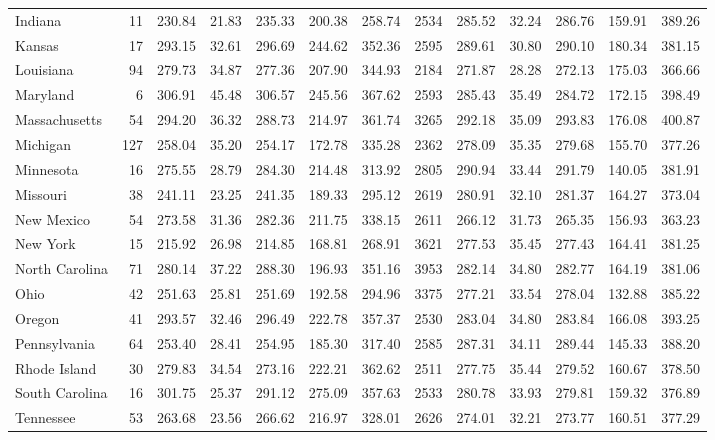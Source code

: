\begin{sidewaystable}[htb]
\begin{center}
{\begin{tabular}{lrrrrrr@{\extracolsep{10pt}}rrrrrr}
  Indiana &  11 & 230.84 & 21.83 & 235.33 & 200.38 & 258.74 & 2534 & 285.52 & 32.24 & 286.76 & 159.91 & 389.26 \\ 
  Kansas &  17 & 293.15 & 32.61 & 296.69 & 244.62 & 352.36 & 2595 & 289.61 & 30.80 & 290.10 & 180.34 & 381.15 \\ 
  Louisiana &  94 & 279.73 & 34.87 & 277.36 & 207.90 & 344.93 & 2184 & 271.87 & 28.28 & 272.13 & 175.03 & 366.66 \\ 
  Maryland &   6 & 306.91 & 45.48 & 306.57 & 245.56 & 367.62 & 2593 & 285.43 & 35.49 & 284.72 & 172.15 & 398.49 \\ 
  Massachusetts &  54 & 294.20 & 36.32 & 288.73 & 214.97 & 361.74 & 3265 & 292.18 & 35.09 & 293.83 & 176.08 & 400.87 \\ 
  Michigan & 127 & 258.04 & 35.20 & 254.17 & 172.78 & 335.28 & 2362 & 278.09 & 35.35 & 279.68 & 155.70 & 377.26 \\ 
  Minnesota &  16 & 275.55 & 28.79 & 284.30 & 214.48 & 313.92 & 2805 & 290.94 & 33.44 & 291.79 & 140.05 & 381.91 \\ 
  Missouri &  38 & 241.11 & 23.25 & 241.35 & 189.33 & 295.12 & 2619 & 280.91 & 32.10 & 281.37 & 164.27 & 373.04 \\ 
  New Mexico &  54 & 273.58 & 31.36 & 282.36 & 211.75 & 338.15 & 2611 & 266.12 & 31.73 & 265.35 & 156.93 & 363.23 \\ 
  New York &  15 & 215.92 & 26.98 & 214.85 & 168.81 & 268.91 & 3621 & 277.53 & 35.45 & 277.43 & 164.41 & 381.25 \\ 
  North Carolina &  71 & 280.14 & 37.22 & 288.30 & 196.93 & 351.16 & 3953 & 282.14 & 34.80 & 282.77 & 164.19 & 381.06 \\ 
  Ohio &  42 & 251.63 & 25.81 & 251.69 & 192.58 & 294.96 & 3375 & 277.21 & 33.54 & 278.04 & 132.88 & 385.22 \\ 
  Oregon &  41 & 293.57 & 32.46 & 296.49 & 222.78 & 357.37 & 2530 & 283.04 & 34.80 & 283.84 & 166.08 & 393.25 \\ 
  Pennsylvania &  64 & 253.40 & 28.41 & 254.95 & 185.30 & 317.40 & 2585 & 287.31 & 34.11 & 289.44 & 145.33 & 388.20 \\ 
  Rhode Island &  30 & 279.83 & 34.54 & 273.16 & 222.21 & 362.62 & 2511 & 277.75 & 35.44 & 279.52 & 160.67 & 378.50 \\ 
  South Carolina &  16 & 301.75 & 25.37 & 291.12 & 275.09 & 357.63 & 2533 & 280.78 & 33.93 & 279.81 & 159.32 & 376.89 \\ 
  Tennessee &  53 & 263.68 & 23.56 & 266.62 & 216.97 & 328.01 & 2626 & 274.01 & 32.21 & 273.77 & 160.51 & 377.29 \\ 

\end{tabular}}
\end{center}
\end{sidewaystable}
